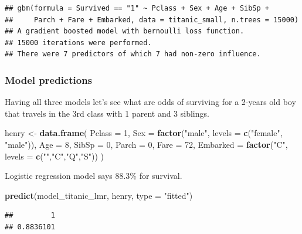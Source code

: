 \documentclass[]{krantz}
\newenvironment{Shaded}{\begin{snugshade}}{\end{snugshade}}
\newcommand{\DataTypeTok}[1]{\textcolor[rgb]{0.13,0.29,0.53}{#1}}
\newcommand{\DecValTok}[1]{\textcolor[rgb]{0.00,0.00,0.81}{#1}}
\newcommand{\KeywordTok}[1]{\textcolor[rgb]{0.13,0.29,0.53}{\textbf{#1}}}
\newcommand{\NormalTok}[1]{#1}
\newcommand{\StringTok}[1]{\textcolor[rgb]{0.31,0.60,0.02}{#1}}
\theoremstyle{definition}
\theoremstyle{definition}
\theoremstyle{definition}
\theoremstyle{remark}
\begin{document}
\begin{verbatim}
## gbm(formula = Survived == "1" ~ Pclass + Sex + Age + SibSp + 
##     Parch + Fare + Embarked, data = titanic_small, n.trees = 15000)
## A gradient boosted model with bernoulli loss function.
## 15000 iterations were performed.
## There were 7 predictors of which 7 had non-zero influence.
\end{verbatim}

\hypertarget{model-predictions}{%
\subsubsection{Model predictions}\label{model-predictions}}

Having all three models let's see what are odds of surviving for a
2-years old boy that travels in the 3rd class with 1 parent and 3
siblings.

\begin{Shaded}
\begin{Highlighting}[]
\NormalTok{henry <-}\StringTok{ }\KeywordTok{data.frame}\NormalTok{(}
            \DataTypeTok{Pclass =} \DecValTok{1}\NormalTok{,}
            \DataTypeTok{Sex =} \KeywordTok{factor}\NormalTok{(}\StringTok{"male"}\NormalTok{, }\DataTypeTok{levels =} \KeywordTok{c}\NormalTok{(}\StringTok{"female"}\NormalTok{, }\StringTok{"male"}\NormalTok{)),}
            \DataTypeTok{Age =} \DecValTok{8}\NormalTok{,}
            \DataTypeTok{SibSp =} \DecValTok{0}\NormalTok{,}
            \DataTypeTok{Parch =} \DecValTok{0}\NormalTok{,}
            \DataTypeTok{Fare =} \DecValTok{72}\NormalTok{,}
            \DataTypeTok{Embarked =} \KeywordTok{factor}\NormalTok{(}\StringTok{"C"}\NormalTok{, }\DataTypeTok{levels =} \KeywordTok{c}\NormalTok{(}\StringTok{""}\NormalTok{,}\StringTok{"C"}\NormalTok{,}\StringTok{"Q"}\NormalTok{,}\StringTok{"S"}\NormalTok{))}
\NormalTok{)}
\end{Highlighting}
\end{Shaded}

Logistic regression model says 88.3\% for survival.

\begin{Shaded}
\begin{Highlighting}[]
\KeywordTok{predict}\NormalTok{(model_titanic_lmr, henry, }\DataTypeTok{type =} \StringTok{"fitted"}\NormalTok{)}
\end{Highlighting}
\end{Shaded}

\begin{verbatim}
##         1 
## 0.8836101
\end{verbatim}
\end{document}
